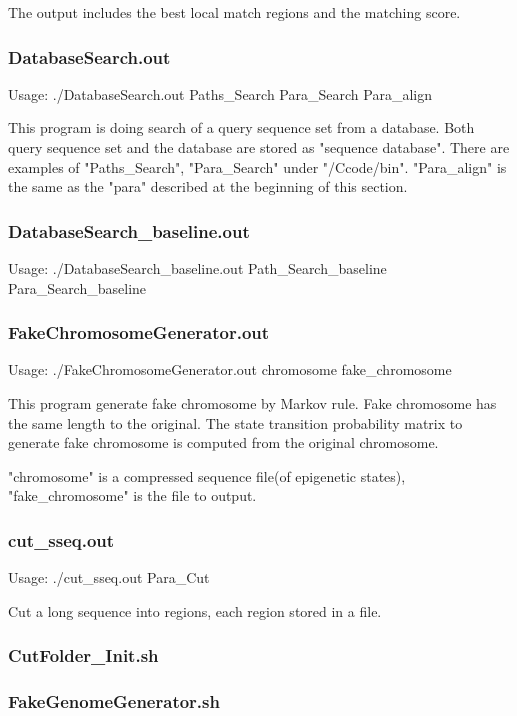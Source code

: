 \documentclass[a4paper]{article}
\begin{document}
\begin{CJK*}{UTF8}{kai}
The output includes the best local match regions and the matching score.

\subsubsection{DatabaseSearch.out}
Usage: ./DatabaseSearch.out Paths\_Search Para\_Search Para\_align

This program is doing search of a query sequence set from a database. Both query sequence set and the database are stored as "sequence database". There are examples of "Paths\_Search", "Para\_Search" under "/Ccode/bin". "Para\_align" is the same as the "para" described at the beginning of this section.

\subsubsection{DatabaseSearch\_baseline.out}

Usage: ./DatabaseSearch\_baseline.out Path\_Search\_baseline Para\_Search\_baseline


\subsubsection{FakeChromosomeGenerator.out}

Usage: ./FakeChromosomeGenerator.out chromosome fake\_chromosome

This program generate fake chromosome by Markov rule. Fake chromosome has the same length to the original. The state transition probability matrix to generate fake chromosome is computed from the original chromosome.

"chromosome" is a compressed sequence file(of epigenetic states), "fake\_chromosome" is the file to output.

\subsubsection{cut\_sseq.out}

Usage: ./cut\_sseq.out Para\_Cut

Cut a long sequence into regions, each region stored in a file.

\subsubsection{CutFolder\_Init.sh}
\subsubsection{FakeGenomeGenerator.sh}


\end{CJK*}
\end{document}
